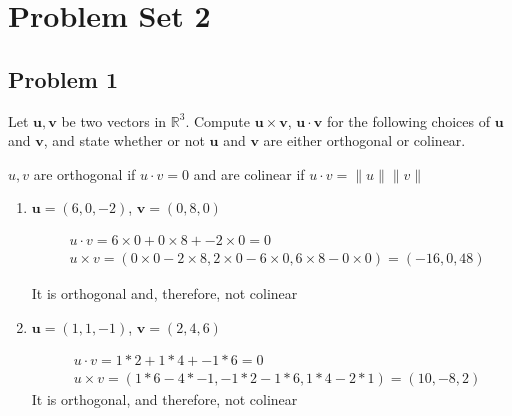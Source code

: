 \documentclass[11pt]{article}
\begin{document}
\section*{Problem Set 2}


\subsection*{Problem 1}
Let $\mathbf{u},\mathbf{v}$ be two vectors in $\mathbb{R}^{3}$. Compute $\mathbf{u}\times\mathbf{v}$, $\mathbf{u}\cdot\mathbf{v}$ for the following choices of $\mathbf{u}$ and $\mathbf{v}$, and state whether or not $\mathbf{u}$ and $\mathbf{v}$ are either orthogonal or colinear.

\begin{note}
  $u,v$ are orthogonal if $u\cdot v = 0$ and are colinear if $u\cdot v = \|u\| \|v\|$
\end{note}

\begin{enumerate}
  \item $\mathbf{u}=(6,0,−2)$, $\mathbf{v} = (0,8,0)$
  \begin{solution}
    \begin{align*}
      &u \cdot v = 6\times0 + 0\times8 + -2\times0 = 0 \\
      &u \times v = (0\times0-2\times8, 2\times0-6\times0, 6\times8-0\times0) = (-16, 0, 48)
    \end{align*}
  \end{solution}
  It is orthogonal and, therefore, not colinear

  \item $\mathbf{u}=(1,1,−1)$, $\mathbf{v} = (2,4,6)$
  \begin{solution}
    \begin{align*}
      &u \cdot v = 1*2 + 1*4 + -1*6 = 0\\
      &u \times v = (1*6-4*-1, -1*2-1*6, 1*4-2*1) = (10, -8, 2)
    \end{align*}
    It is orthogonal, and therefore, not colinear
  \end{solution}
\end{enumerate}
\end{document}
